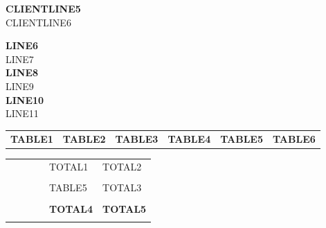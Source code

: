 \documentclass[a4paper]{article}
\newcommand{\lline}[2]{{\color{#1}\noindent\makebox[\linewidth][c]{\rule{1.02\textwidth}{#2}}}}
\begin{document}
    \vspace*{10pt} %
    \noindent
    \begin{minipage}[b]{0.3\textwidth}
        \vspace{0pt} %
        \begin{flushleft}
            \normalsize{\textbf{CLIENTLINE5}} \\
            \normalsize{CLIENTLINE6}
        \end{flushleft}
    \end{minipage}
    \hfill
    \begin{minipage}[b]{0.5\textwidth}
        \vspace{0pt} %
        \begin{flushright}
            \normalsize{\textbf{LINE6}} \\
            \normalsize{LINE7} \\
            \normalsize{\textbf{LINE8}} \\
            \normalsize{LINE9} \\
            \normalsize{\textbf{LINE10}} \\
            \normalsize{LINE11} \\
        \end{flushright}
    \end{minipage}
    \vspace*{20pt} %
    \noindent

    \begin{tabularx}{\linewidth}{
            >{\hsize=2\hsize}X
            >{\hsize=1\hsize}X
            >{\hsize=0.5\hsize}X
            >{\hsize=0.5\hsize}X
            >{\hsize=1\hsize}X
            >{\raggedleft\arraybackslash\hsize=1\hsize}X}
        \textbf{TABLE1} & \textbf{TABLE2} & \textbf{TABLE3} & \textbf{TABLE4} & \textbf{TABLE5} & \textbf{TABLE6}
    \end{tabularx}
    \vspace*{-10pt}
    \lline{blue}{0.8pt}

    \vspace*{10pt}

    \begin{tabularx}{\linewidth}{
            >{\hsize=2\hsize}X
            >{\hsize=1\hsize}X
            >{\hsize=0.5\hsize}X
            >{\hsize=0.5\hsize}X
            >{\raggedleft\arraybackslash\hsize=1\hsize}X
            >{\raggedleft\arraybackslash\hsize=1\hsize}X}
        &&&& TOTAL1 & TOTAL2 \\ \\
        &&&& TABLE5 & TOTAL3 \\ \\
        &&&& \textbf{TOTAL4} & \textbf{TOTAL5} \\ \\
    \end{tabularx}
\end{document}
